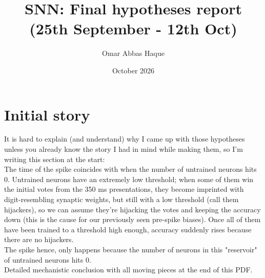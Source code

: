 \documentclass{article}
\title{SNN: Final hypotheses report (25th September - 12th Oct)}
\author{Omar Abbas Haque}
\date{October 2026}
\begin{document}
\maketitle

\section{Initial story}
It is hard to explain (and understand) why I came up with those hypotheses unless you already know the story I had in mind while making them, so I'm writing this section at the start: \\
The time of the spike coincides with when the number of untrained neurons hits 0. Untrained neurons have an extremely low threshold; when some of them win the initial votes from the 350 ms presentations, they become imprinted with digit-resembling synaptic weights, but still with a low threshold (call them hijackers), so we can assume they're hijacking the votes and keeping the accuracy down (this is the cause for our previously seen pre-spike biases). Once all of them have been trained to a threshold high enough, accuracy suddenly rises because there are no hijackers. \\
The spike hence, only happens because the number of neurons in this "reservoir" of untrained neurons hits 0. \\
Detailed mechanistic conclusion with all moving pieces at the end of this PDF.
\end{document}
